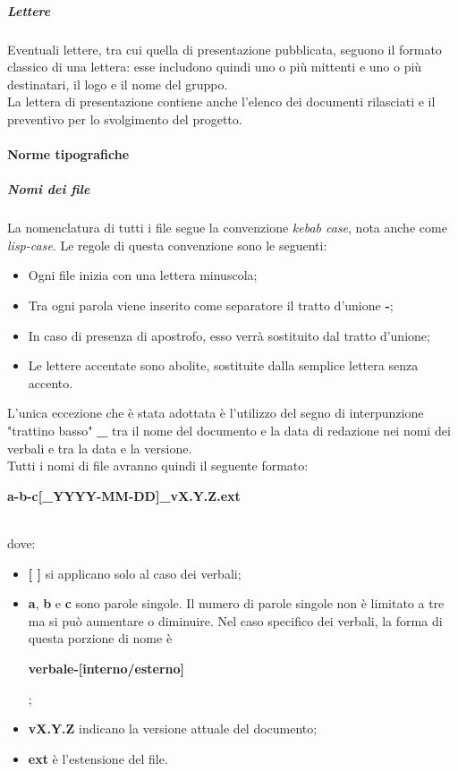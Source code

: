 \documentclass[../norme-di-progetto.tex]{subfiles}
\begin{document}
\subparagraph{Lettere}
Eventuali lettere, tra cui quella di presentazione pubblicata, seguono il formato classico di una lettera: esse includono quindi uno o più mittenti e uno o più destinatari, il logo e il nome del gruppo. \\
La lettera di presentazione contiene anche l'elenco dei documenti rilasciati e il preventivo per lo svolgimento del progetto.

\paragraph{Norme tipografiche}
\subparagraph{Nomi dei file}
La nomenclatura di tutti i file segue la convenzione \textit{kebab case}, nota anche come \textit{lisp-case}. Le regole di questa convenzione sono le seguenti:
\begin{itemize}
  \item Ogni file inizia con una lettera minuscola;
  \item Tra ogni parola viene inserito come separatore il tratto d'unione \textbf{-};
  \item In caso di presenza di apostrofo, esso verrà sostituito dal tratto d'unione;
  \item Le lettere accentate sono abolite, sostituite dalla semplice lettera senza accento.
\end{itemize}
L'unica eccezione che è stata adottata è l'utilizzo del segno di interpunzione "trattino basso" \textbf{\_} tra il nome del documento e la data di redazione nei nomi dei verbali e tra la data e la versione. \\
Tutti i nomi di file avranno quindi il seguente formato: \\ \centerline{\textbf{a-b-c[\_YYYY-MM-DD]\_vX.Y.Z.ext}} \\
dove:
\begin{itemize}
  \item \textbf{[ ]} si applicano solo al caso dei verbali;
  \item \textbf{a}, \textbf{b} e \textbf{c} sono parole singole. Il numero di parole singole non è limitato a tre ma si può aumentare o diminuire. Nel caso specifico dei verbali, la forma di questa porzione di nome è \\ \centerline{\textbf{verbale-[interno/esterno]}};
  \item \textbf{vX.Y.Z} indicano la versione attuale del documento;
  \item \textbf{ext} è l'estensione del file.
\end{itemize}
\end{document}
